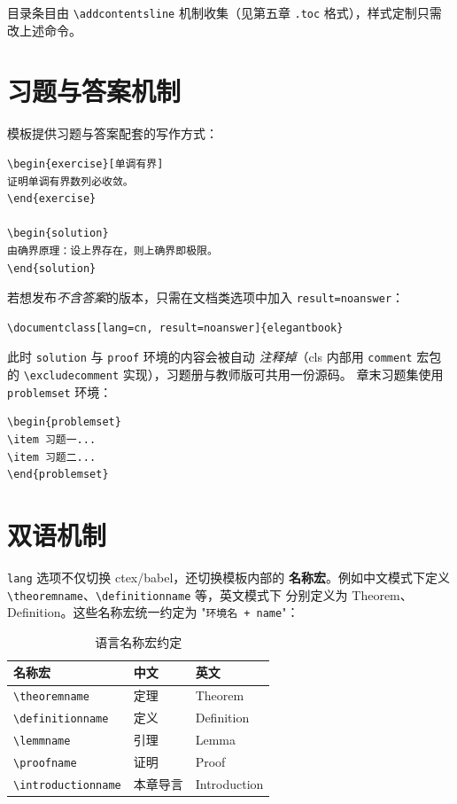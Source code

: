 目录条目由 \verb|\addcontentsline| 机制收集（见第五章
\texttt{.toc} 格式），样式定制只需改上述命令。

\section{习题与答案机制}

模板提供习题与答案配套的写作方式：

\begin{lstlisting}
\begin{exercise}[单调有界]
证明单调有界数列必收敛。
\end{exercise}

\begin{solution}
由确界原理：设上界存在，则上确界即极限。
\end{solution}
\end{lstlisting}

若想发布\emph{不含答案}的版本，只需在文档类选项中加入
\texttt{result=noanswer}：
\begin{lstlisting}
\documentclass[lang=cn, result=noanswer]{elegantbook}
\end{lstlisting}
此时 \texttt{solution} 与 \texttt{proof} 环境的内容会被自动
\emph{注释掉}（cls 内部用 \texttt{comment} 宏包的
\verb|\excludecomment| 实现），习题册与教师版可共用一份源码。
章末习题集使用 \texttt{problemset} 环境：

\begin{lstlisting}
\begin{problemset}
\item 习题一...
\item 习题二...
\end{problemset}
\end{lstlisting}

\section{双语机制}

\texttt{lang} 选项不仅切换 ctex/babel，还切换模板内部的
\textbf{名称宏}。例如中文模式下定义
\verb|\theoremname|、\verb|\definitionname| 等，英文模式下
分别定义为 Theorem、Definition。这些名称宏统一约定为
"\texttt{环境名 + name}"：

\begin{table}[htbp]
  \centering
  \caption{语言名称宏约定}\label{tab:names}
  \begin{tabular}{lll}
    \toprule
    名称宏 & 中文 & 英文 \\
    \midrule
    \texttt{\textbackslash theoremname} & 定理 & Theorem \\
    \texttt{\textbackslash definitionname} & 定义 & Definition \\
    \texttt{\textbackslash lemmname} & 引理 & Lemma \\
    \texttt{\textbackslash proofname} & 证明 & Proof \\
    \texttt{\textbackslash introductionname} & 本章导言 & Introduction \\
    \bottomrule
  \end{tabular}
\end{table}

